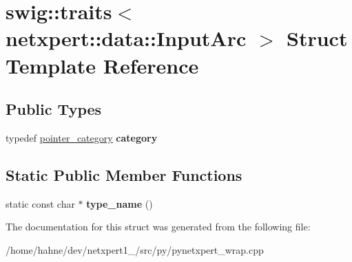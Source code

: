 \hypertarget{structswig_1_1traits_3_01netxpert_1_1data_1_1InputArc_01_4}{}\section{swig\+:\+:traits$<$ netxpert\+:\+:data\+:\+:Input\+Arc $>$ Struct Template Reference}
\label{structswig_1_1traits_3_01netxpert_1_1data_1_1InputArc_01_4}
\subsection*{Public Types}
\begin{DoxyCompactItemize}
\item 
typedef \hyperlink{structswig_1_1pointer__category}{pointer\+\_\+category} {\bfseries category}\hypertarget{structswig_1_1traits_3_01netxpert_1_1data_1_1InputArc_01_4_ab0b75a2bfd561d22db8c52e6164c2957}{}\label{structswig_1_1traits_3_01netxpert_1_1data_1_1InputArc_01_4_ab0b75a2bfd561d22db8c52e6164c2957}

\end{DoxyCompactItemize}
\subsection*{Static Public Member Functions}
\begin{DoxyCompactItemize}
\item 
static const char $\ast$ {\bfseries type\+\_\+name} ()\hypertarget{structswig_1_1traits_3_01netxpert_1_1data_1_1InputArc_01_4_a364eaa6b931ad6b497363669050cc185}{}\label{structswig_1_1traits_3_01netxpert_1_1data_1_1InputArc_01_4_a364eaa6b931ad6b497363669050cc185}

\end{DoxyCompactItemize}


The documentation for this struct was generated from the following file\+:\begin{DoxyCompactItemize}
\item 
/home/hahne/dev/netxpert1\+\_/src/py/pynetxpert\+\_\+wrap.\+cpp\end{DoxyCompactItemize}
